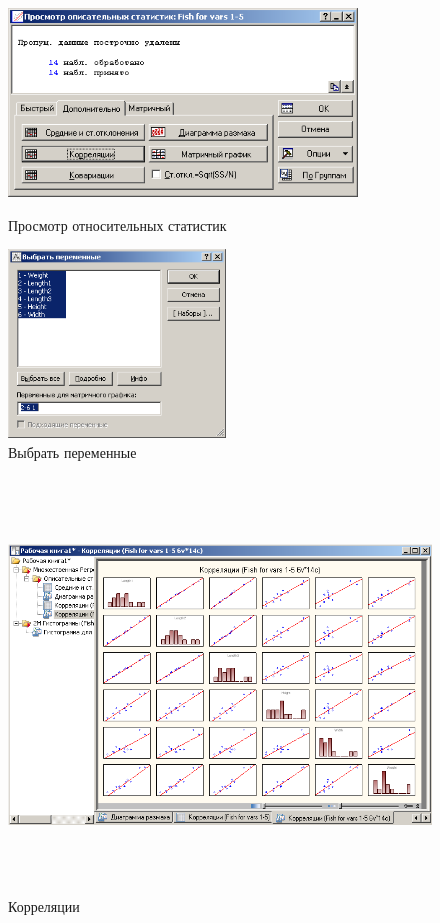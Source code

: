\begin{figure}[!h]
  \centering
  \begin{minipage}{0.49\textwidth}
    \centering

    \includegraphics[height=5cm]
    {inc/var5__17.PNG}

    \caption{Просмотр относительных статистик}
    \label{fig:var5__17}
  \end{minipage}
  \begin{minipage}{0.49\textwidth}
    \centering

    \includegraphics[height=5cm]
    {inc/var5__18.PNG}

    \caption{Выбрать переменные}
    \label{fig:var5__18}
  \end{minipage}
\end{figure}

\begin{figure}[!h]
  \centering

  \includegraphics[height=11cm]
  {inc/var5__19.PNG}

  \caption{Корреляции}

  \label{fig:var5__19}
\end{figure}

